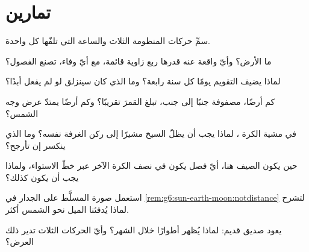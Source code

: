 \section{تمارين}

\begin{exercise}[$\star$]\label{exo:g6:sun-earth-moon:1}
سمِّ حركات المنظومة الثلاث والساعة التي تلفّها كل واحدة.
\end{exercise}

\begin{exercise}[$\star$]\label{exo:g6:sun-earth-moon:2}
ما  الأرض؟ وأيّ واقعة عنه قدرها ربع زاوية قائمة، مع أيّ
وفاء، تصنع الفصول؟
\end{exercise}

\begin{exercise}[$\star$]\label{exo:g6:sun-earth-moon:3}
لماذا يضيف التقويم يومًا كل سنة رابعة؟ وما الذي كان سينزلق لو
لم يفعل أبدًا؟
\end{exercise}

\begin{exercise}[$\star$]\label{exo:g6:sun-earth-moon:4}
كم أرضًا، مصفوفة جنبًا إلى جنب، تبلغ القمرَ تقريبًا؟ وكم أرضًا
يمتدّ عرض وجه الشمس؟
\end{exercise}

\begin{exercise}[$\star$]\label{exo:g6:sun-earth-moon:5}
في مشية الكرة ، لماذا يجب أن يظلّ السيخ مشيرًا إلى ركن
الغرفة نفسه؟ وما الذي ينكسر إن تأرجح؟
\end{exercise}

\begin{exercise}[$\star$]\label{exo:g6:sun-earth-moon:6}
حين يكون الصيف هنا، أيّ فصل يكون في نصف الكرة الآخر عبر خطّ
الاستواء، ولماذا يجب أن يكون كذلك؟
\end{exercise}

\begin{exercise}[$\star$]\label{exo:g6:sun-earth-moon:7}
استعمل صورة  المسلَّط على الجدار في
\cref{rem:g6:sun-earth-moon:notdistance} لتشرح لماذا يُدفئنا
الميل نحو الشمس أكثر.
\end{exercise}

\begin{exercise}[$\star$]\label{exo:g6:sun-earth-moon:8}
يعود صديق قديم: لماذا يُظهر  أطوارًا خلال الشهر؟ وأيّ
الحركات الثلاث تدير ذلك العرض؟
\end{exercise}

